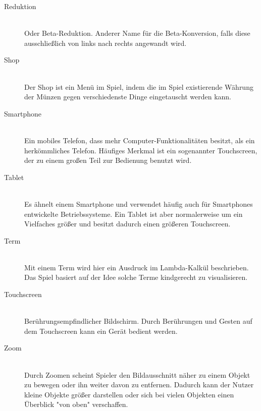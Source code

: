 \begin{description}
	\item[Reduktion] \hfill \\
	Oder Beta-Reduktion. Anderer Name für die Beta-Konversion, falls diese ausschließlich von links nach rechts angewandt wird.
	
	\item[Shop] \hfill \\
	Der Shop ist ein Menü im Spiel, indem die im Spiel existierende Währung der Münzen gegen verschiedenste Dinge eingetauscht werden kann.
	
	\item[Smartphone] \hfill \\
	Ein mobiles Telefon, dass mehr Computer-Funktionalitäten besitzt, als ein herkömmliches Telefon. Häufiges Merkmal ist ein sogenannter
	Touchscreen, der zu einem großen Teil zur Bedienung benutzt wird.
	
	\item[Tablet] \hfill \\
	Es ähnelt einem Smartphone und verwendet häufig auch für Smartphones entwickelte Betriebssysteme. 
	Ein Tablet ist aber normalerweise um ein Vielfaches größer und besitzt dadurch einen größeren Touchscreen.

	\item[Term] \hfill \\
	Mit einem Term wird hier ein Ausdruck im Lambda-Kalkül beschrieben. Das Spiel basiert auf der Idee solche Terme kindgerecht 
	zu visualisieren.
	
	\item[Touchscreen] \hfill \\
	Berührungsempfindlicher Bildschirm. Durch Berührungen und Gesten auf dem Touchscreen kann ein Gerät bedient werden.
	
	\item[Zoom] \hfill \\
	Durch Zoomen scheint Spieler den Bildausschnitt näher zu einem Objekt zu bewegen oder ihn weiter davon zu entfernen.
	Dadurch kann der Nutzer kleine Objekte größer darstellen oder sich bei vielen Objekten einen Überblick "von oben" verschaffen. 
\end{description}
